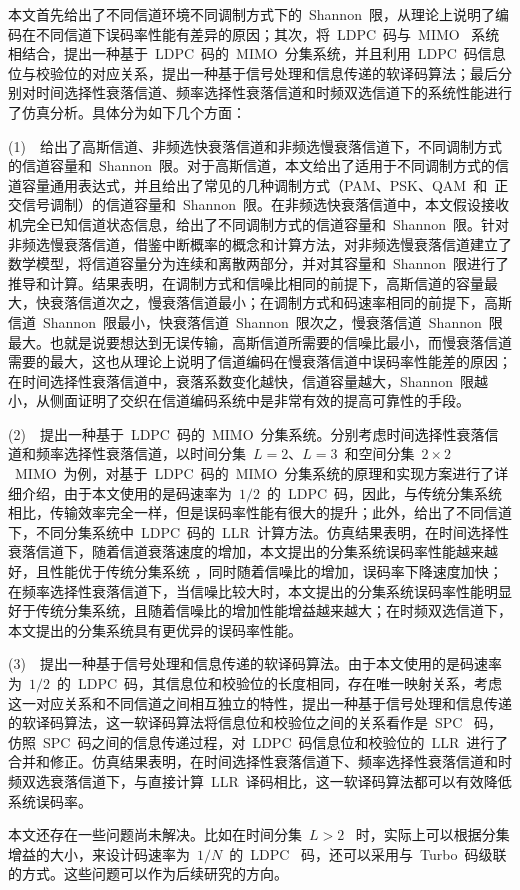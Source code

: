 
本文首先给出了不同信道环境不同调制方式下的~Shannon~限，从理论上说明了编码在不同信道下误码率性能有差异的原因；其次，将~LDPC~码与~MIMO~ 系统相结合，提出一种基于~LDPC~码的~MIMO~分集系统，并且利用~LDPC~码信息位与校验位的对应关系，提出一种基于信号处理和信息传递的软译码算法；最后分别对时间选择性衰落信道、频率选择性衰落信道和时频双选信道下的系统性能进行了仿真分析。具体分为如下几个方面：

(1)~~给出了高斯信道、非频选快衰落信道和非频选慢衰落信道下，不同调制方式的信道容量和~Shannon~限。对于高斯信道，本文给出了适用于不同调制方式的信道容量通用表达式，并且给出了常见的几种调制方式（PAM、PSK、QAM~和~正交信号调制）的信道容量和~Shannon~限。在非频选快衰落信道中，本文假设接收机完全已知信道状态信息，给出了不同调制方式的信道容量和~Shannon~限。针对非频选慢衰落信道，借鉴中断概率的概念和计算方法，对非频选慢衰落信道建立了数学模型，将信道容量分为连续和离散两部分，并对其容量和~Shannon~限进行了推导和计算。结果表明，在调制方式和信噪比相同的前提下，高斯信道的容量最大，快衰落信道次之，慢衰落信道最小；在调制方式和码速率相同的前提下，高斯信道~Shannon~限最小，快衰落信道~Shannon~限次之，慢衰落信道~Shannon~限最大。也就是说要想达到无误传输，高斯信道所需要的信噪比最小，而慢衰落信道需要的最大，这也从理论上说明了信道编码在慢衰落信道中误码率性能差的原因；在时间选择性衰落信道中，衰落系数变化越快，信道容量越大，Shannon~限越小，从侧面证明了交织在信道编码系统中是非常有效的提高可靠性的手段。

(2)~~提出一种基于~LDPC~码的~MIMO~分集系统。分别考虑时间选择性衰落信道和频率选择性衰落信道，以时间分集~$L = 2$、$L = 3$~和空间分集~$2 \times 2$~MIMO~为例，对基于~LDPC~码的~MIMO~分集系统的原理和实现方案进行了详细介绍，由于本文使用的是码速率为~$1/2$~的~LDPC~码，因此，与传统分集系统相比，传输效率完全一样，但是误码率性能有很大的提升；此外，给出了不同信道下，不同分集系统中~LDPC~码的~LLR~计算方法。仿真结果表明，在时间选择性衰落信道下，随着信道衰落速度的增加，本文提出的分集系统误码率性能越来越好，且性能优于传统分集系统 ，同时随着信噪比的增加，误码率下降速度加快；在频率选择性衰落信道下，当信噪比较大时，本文提出的分集系统误码率性能明显好于传统分集系统，且随着信噪比的增加性能增益越来越大；在时频双选信道下，本文提出的分集系统具有更优异的误码率性能。

(3)~~提出一种基于信号处理和信息传递的软译码算法。由于本文使用的是码速率为~$1/2$~的~LDPC~码，其信息位和校验位的长度相同，存在唯一映射关系，考虑这一对应关系和不同信道之间相互独立的特性，提出一种基于信号处理和信息传递的软译码算法，这一软译码算法将信息位和校验位之间的关系看作是~SPC~ 码，仿照~SPC~码之间的信息传递过程，对~LDPC~码信息位和校验位的~LLR~进行了合并和修正。仿真结果表明，在时间选择性衰落信道下、频率选择性衰落信道和时频双选衰落信道下，与直接计算~LLR~译码相比，这一软译码算法都可以有效降低系统误码率。

本文还存在一些问题尚未解决。比如在时间分集~$L > 2$~ 时，实际上可以根据分集增益的大小，来设计码速率为~$1/N$~的~LDPC~ 码，还可以采用与~Turbo~码级联的方式。这些问题可以作为后续研究的方向。





